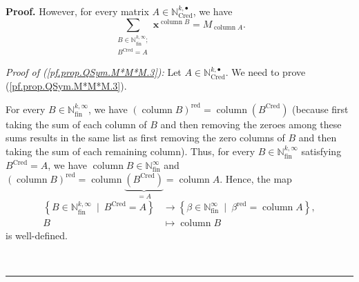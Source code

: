 \documentclass
[numbers=enddot,12pt,final,onecolumn,notitlepage,abstracton]{scrartcl}%
\theoremstyle{definition}
\newenvironment{proof}[1][Proof]{\noindent\textbf{#1.} }{\ \rule{0.5em}{0.5em}}
\let\sumnonlimits\sum
\renewcommand{\sum}{\sumnonlimits\limits}
\begin{document}
\begin{proof}
However, for every matrix $A\in\mathbb{N}_{\operatorname*{Cred}}^{k,\bullet}$,
we have%
\begin{equation}
\sum_{\substack{B\in\mathbb{N}_{\operatorname*{fin}}^{k,\infty}%
;\\B^{\operatorname*{Cred}}=A}}\mathbf{x}^{\operatorname*{column}%
B}=M_{\operatorname*{column}A}. \label{pf.prop.QSym.M*M*M.3}%
\end{equation}


\textit{Proof of (\ref{pf.prop.QSym.M*M*M.3}):} Let $A\in\mathbb{N}%
_{\operatorname*{Cred}}^{k,\bullet}$. We need to prove
(\ref{pf.prop.QSym.M*M*M.3}).

For every $B\in\mathbb{N}_{\operatorname*{fin}}^{k,\infty}$, we have $\left(
\operatorname*{column}B\right)  ^{\operatorname*{red}}=\operatorname*{column}%
\left(  B^{\operatorname*{Cred}}\right)  $ (because first taking the sum of
each column of $B$ and then removing the zeroes among these sums results in
the same list as first removing the zero columns of $B$ and then taking the
sum of each remaining column). Thus, for every $B\in\mathbb{N}%
_{\operatorname*{fin}}^{k,\infty}$ satisfying $B^{\operatorname*{Cred}}=A$, we
have $\operatorname*{column}B\in\mathbb{N}_{\operatorname*{fin}}^{\infty}$ and
$\left(  \operatorname*{column}B\right)  ^{\operatorname*{red}}%
=\operatorname*{column}\underbrace{\left(  B^{\operatorname*{Cred}}\right)
}_{=A}=\operatorname*{column}A$. Hence, the map%
\begin{align}
\left\{  B\in\mathbb{N}_{\operatorname*{fin}}^{k,\infty}\ \mid
\ B^{\operatorname*{Cred}}=A\right\}   &  \rightarrow\left\{  \beta
\in\mathbb{N}_{\operatorname*{fin}}^{\infty}\ \mid\ \beta^{\operatorname*{red}%
}=\operatorname*{column}A\right\}  ,\nonumber\\
B  &  \mapsto\operatorname*{column}B \label{pf.prop.QSym.M*M*M.3.pf.1}%
\end{align}
is well-defined.


\end{proof}
\end{document}
